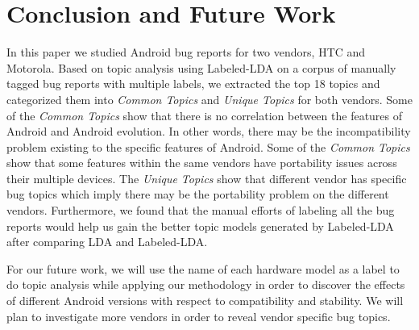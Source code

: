 \documentclass[10pt, conference, compsocconf]{IEEEtran}
\begin{document}
\section{Conclusion and Future Work}
\label{sec:conclusions}

In this paper we studied Android bug reports for two vendors, HTC and
Motorola. Based on topic analysis using Labeled-LDA on a corpus of
manually tagged bug reports with multiple labels, we extracted the top
18 topics and categorized them into \textit{Common Topics} and
\textit{Unique Topics} for both vendors. Some of the \textit{Common
  Topics} show that there is no correlation between the features of
Android and Android evolution. In other words, there may be the
incompatibility problem existing to the specific features of
Android. Some of the \textit{Common Topics} show that some features
within the same vendors have portability issues across their multiple
devices. The \textit{Unique Topics} show that different vendor has
specific bug topics which imply there may be the portability problem
on the different vendors. Furthermore, we found that the manual
efforts of labeling all the bug reports would help us gain the better
topic models generated by Labeled-LDA after comparing LDA and
Labeled-LDA.

For our future work, we will use the name of each hardware model as a
label to do topic analysis while applying our methodology in order to
discover the effects of different Android versions with respect to
compatibility and stability. We will plan to investigate more vendors
in order to reveal vendor specific bug topics.

\end{document}
